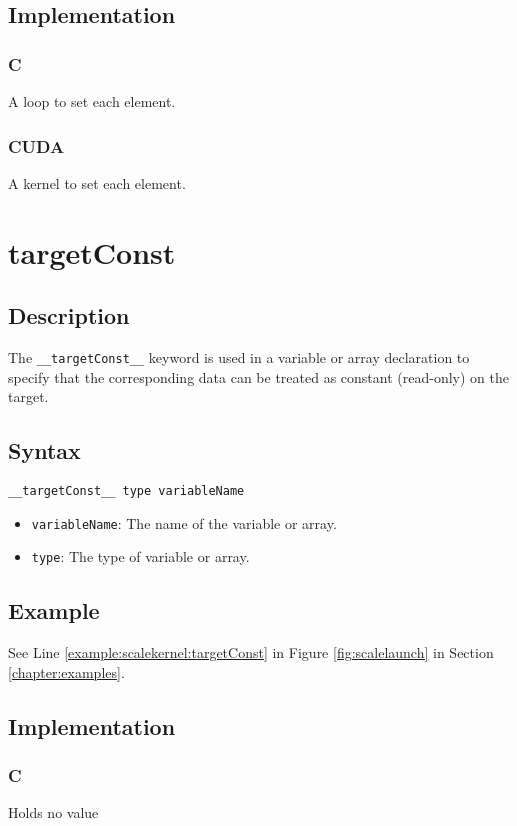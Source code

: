 \subsection{Implementation}
\subsubsection{C}
A loop to set each element.
\subsubsection{CUDA}
A kernel to set each element.

\newpage
\section{targetConst}
\subsection{Description}

The \verb+__targetConst__+ keyword is used in a variable or array declaration
to specify that the corresponding data can be treated as constant (read-only) on the target.

\subsection{Syntax}
\begin{verbatim}
__targetConst__ type variableName
\end{verbatim}

\begin{itemize}
\item \verb+variableName+: The name of the variable or array.
\item \verb+type+: The type of variable or array.
\end{itemize}


\subsection{Example}
See Line \ref{example:scalekernel:targetConst} in Figure \ref{fig:scalelaunch} in Section \ref{chapter:examples}.
\subsection{Implementation}
\subsubsection{C}
Holds no value
